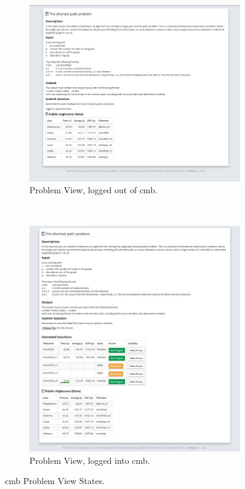 \begin{figure}
    \centering
    \begin{subfigure}[b]{0.82\textwidth}
        \includegraphics[width=\textwidth]{figs/problem.jpg}
        \caption{Problem View, logged out of \gls{cmb}.}
        \label{fig:problem}
    \end{subfigure}
    ~ %
    \begin{subfigure}[b]{0.82\textwidth}
        \includegraphics[width=\textwidth]{figs/problem_loggedin.jpg}
        \caption{Problem View, logged into \gls{cmb}.}
        \label{fig:problem-loggedin}
    \end{subfigure}
    \caption{\gls{cmb} Problem View States.}\label{fig:problem-view}
\end{figure}

